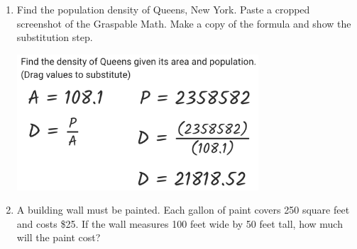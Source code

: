 \documentclass[12pt, twoside]{article}
\begin{document}
\begin{enumerate}
\newpage
\item Find the population density of Queens, New York. Paste a cropped screenshot of the Graspable Math. Make a copy of the formula and show the substitution step.
\vspace{4cm}
\begin{flushright}
  \includegraphics[width=9cm]{6-13-3-solution.png}
\end{flushright}


\newpage
\item A building wall must be painted. Each gallon of paint covers 250 square feet and costs \$25. If the wall measures 100 feet wide by 50 feet tall, how much will the paint cost?

\end{enumerate}
\end{document}
